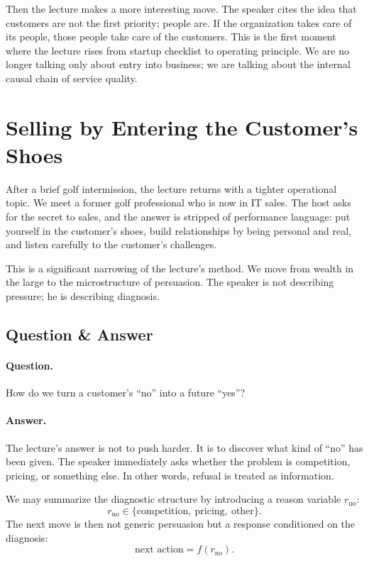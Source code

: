 Then the lecture makes a more interesting move. The speaker cites the idea that customers are not the first priority; people are. If the organization takes care of its people, those people take care of the customers. This is the first moment where the lecture rises from startup checklist to operating principle. We are no longer talking only about entry into business; we are talking about the internal causal chain of service quality.

\section{Selling by Entering the Customer's Shoes}

After a brief golf intermission, the lecture returns with a tighter operational topic. We meet a former golf professional who is now in IT sales. The host asks for the secret to sales, and the answer is stripped of performance language: put yourself in the customer's shoes, build relationships by being personal and real, and listen carefully to the customer's challenges.

This is a significant narrowing of the lecture's method. We move from wealth in the large to the microstructure of persuasion. The speaker is not describing pressure; he is describing diagnosis.

\subsection{Question \& Answer}

\paragraph{Question.} How do we turn a customer's ``no'' into a future ``yes''?

\paragraph{Answer.} The lecture's answer is not to push harder. It is to discover what kind of ``no'' has been given. The speaker immediately asks whether the problem is competition, pricing, or something else. In other words, refusal is treated as information.

We may summarize the diagnostic structure by introducing a reason variable \(r_{\text{no}}\):
\begin{equation}
r_{\text{no}} \in \{\text{competition},\ \text{pricing},\ \text{other}\}.
\end{equation}
The next move is then not generic persuasion but a response conditioned on the diagnosis:
\begin{equation}
\text{next action} = f\!\left(r_{\text{no}}\right).
\end{equation}

